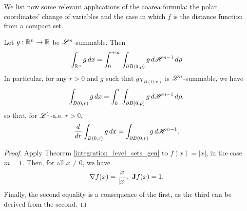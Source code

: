 We list now some relevant applications of the coarea formula: the polar coordinates' change of variables and the case in which $f$ is the distance function from a compact set.

\begin{theorem} \label{polar_coordinates}
Let $g : \mathbb{R}^{n} \to \mathbb{R}$ be $\mathscr{L}^{n}$-summable. Then
\begin{equation*} 
\int_{\mathbb{R}^{n}} g \, dx = \int_{0}^{+\infty} \int_{\partial B(0, \rho)} g \, d \mathscr{H}^{n - 1} \, d \rho
\end{equation*}
In particular, for any $r > 0$ and $g$ such that $g \chi_{B(0, r)}$ is $\mathscr{L}^{n}$-summable, we have
\begin{equation*}
\int_{B(0, r)} g \, dx = \int_{0}^{r} \int_{\partial B(0, \rho)} g \, d \mathscr{H}^{n - 1} \, d \rho,
\end{equation*}
so that, for $\mathscr{L}^{1}$-a.e. $r > 0$,
\begin{equation*}
\frac{d}{dr} \int_{B(0, r)} g \, dx = \int_{\partial B(0, r)} g \, d \mathscr{H}^{n - 1}.
\end{equation*}
\end{theorem}
\begin{proof}
Apply Theorem \ref{integration_level_sets_gen} to $f(x) = |x|$, in the case $m = 1$. Then, for all $x \neq 0$, we have $$\nabla f(x) = \frac{x}{|x|}, \ {\bf J} f(x) = 1.$$
Finally, the second equality is a consequence of the first, as the third can be derived from the second.
\end{proof}

